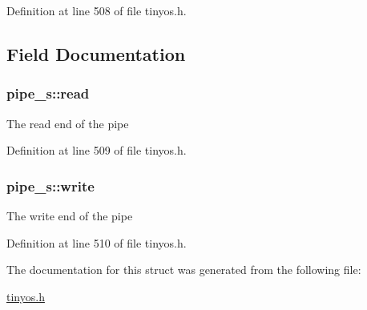 Definition at line 508 of file tinyos.\+h.



\subsection{Field Documentation}
\subsubsection[{\texorpdfstring{read}{read}}]{ pipe\+\_\+s\+::read}\hypertarget{structpipe__s_ad0839b4f9b1fdb0241411952203f18aa}{}\label{structpipe__s_ad0839b4f9b1fdb0241411952203f18aa}
The read end of the pipe 

Definition at line 509 of file tinyos.\+h.

\subsubsection[{\texorpdfstring{write}{write}}]{ pipe\+\_\+s\+::write}\hypertarget{structpipe__s_a69acc9cdf5f10195c43491e3ffa98cb1}{}\label{structpipe__s_a69acc9cdf5f10195c43491e3ffa98cb1}
The write end of the pipe 

Definition at line 510 of file tinyos.\+h.



The documentation for this struct was generated from the following file\+:\begin{DoxyCompactItemize}
\item 
\hyperlink{tinyos_8h}{tinyos.\+h}\end{DoxyCompactItemize}
